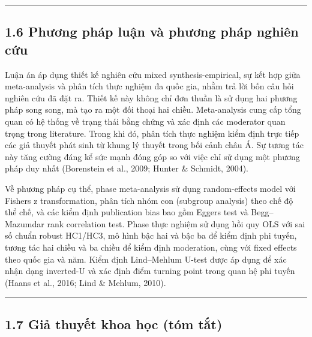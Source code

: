 \documentclass[12pt,a4paper]{article}
\begin{document}
\begin{center}\rule{0.5\linewidth}{0.5pt}\end{center}

\hypertarget{16-phux1b0ux1a1ng-phuxe1p-luux1eadn-vuxe0-phux1b0ux1a1ng-phuxe1p-nghiuxean-cux1ee9u}{%
\subsection{1.6 Phương pháp luận và phương pháp nghiên
cứu}\label{16-phux1b0ux1a1ng-phuxe1p-luux1eadn-vuxe0-phux1b0ux1a1ng-phuxe1p-nghiuxean-cux1ee9u}}

Luận án áp dụng thiết kế nghiên cứu mixed synthesis-empirical, sự kết
hợp giữa meta-analysis và phân tích thực nghiệm đa quốc gia, nhằm trả
lời bốn câu hỏi nghiên cứu đã đặt ra. Thiết kế này không chỉ đơn thuần
là sử dụng hai phương pháp song song, mà tạo ra một đối thoại hai chiều.
Meta-analysis cung cấp tổng quan có hệ thống về trạng thái bằng chứng và
xác định các moderator quan trọng trong literature. Trong khi đó, phân
tích thực nghiệm kiểm định trực tiếp các giả thuyết phát sinh từ khung
lý thuyết trong bối cảnh châu Á. Sự tương tác này tăng cường đáng kể sức
mạnh đóng góp so với việc chỉ sử dụng một phương pháp duy nhất
(Borenstein et al., 2009; Hunter \& Schmidt, 2004).

Về phương pháp cụ thể, phase meta-analysis sử dụng random-effects model
với Fisher\textquotesingle s z transformation, phân tích nhóm con
(subgroup analysis) theo chế độ thể chế, và các kiểm định publication
bias bao gồm Egger\textquotesingle s test và Begg--Mazumdar rank
correlation test. Phase thực nghiệm sử dụng hồi quy OLS với sai số chuẩn
robust HC1/HC3, mô hình bậc hai và bậc ba để kiểm định phi tuyến, tương
tác hai chiều và ba chiều để kiểm định moderation, cùng với fixed
effects theo quốc gia và năm. Kiểm định Lind--Mehlum U-test được áp dụng
để xác nhận dạng inverted-U và xác định điểm turning point trong quan hệ
phi tuyến (Haans et al., 2016; Lind \& Mehlum, 2010).

\begin{center}\rule{0.5\linewidth}{0.5pt}\end{center}

\hypertarget{17-giux1ea3-thuyux1ebft-khoa-hux1ecdc-tuxf3m-tux1eaft}{%
\subsection{1.7 Giả thuyết khoa học (tóm
tắt)}\label{17-giux1ea3-thuyux1ebft-khoa-hux1ecdc-tuxf3m-tux1eaft}}
\end{document}
